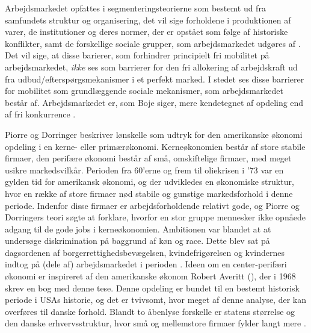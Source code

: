 Arbejdsmarkedet opfattes i segmenteringsteorierne som bestemt ud fra samfundets struktur og organisering, det vil sige forholdene i produktionen af varer, de institutioner og deres normer, der er opstået som følge af historiske konflikter, samt de forskellige sociale grupper, som arbejdsmarkedet udgøres af \parencite[9]{Boje1985}. Det  vil sige, at disse barierer, som forhindrer principielt fri mobilitet på arbejdsmarkedet, \emph{ikke} ses som barrierer for den fri allokering af arbejdskraft ud fra udbud/efterspørgsmekanismer i et perfekt marked. I stedet ses disse barrierer for mobilitet som grundlæggende sociale mekanismer, som arbejdsmarkedet består af. Arbejdsmarkedet er, som Boje siger, mere kendetegnet af opdeling end af fri konkurrence \parencite[8]{Boje1985}. 

Piorre og Dorringer beskriver lønskelle som udtryk for den amerikanske økonomi opdeling i en kerne- eller primærøkonomi. Kerneøkonomien består af store stabile firmaer, den perifære økonomi består af små, omskiftelige firmaer, med meget usikre markedsvilkår. %
Perioden fra 60'erne og frem til oliekrisen i '73 var en gylden tid for amerikansk økonomi, og der udvikledes en økonomiske struktur, hvor en række af store firmaer nød stabile og gunstige markedsforhold i denne periode. %
Indenfor disse firmaer er arbejdsforholdende relativt gode, og Piorre og Dorringers teori søgte at forklare, hvorfor en stor gruppe mennesker ikke opnåede adgang til de gode jobs i kerneøkonomien. Ambitionen var blandet at at undersøge diskrimination på baggrund af køn og race. Dette blev sat på dagsordenen af borgerrettighedsbevægelsen, kvindefrigørelsen og kvindernes indtog på (dele af) arbejdsmarkedet i perioden \parencites[1216]{Cain1976}. Ideen om en center-perifæri økonomi er inspireret af den amerikanske økonom Robert Averitt (\citeyear{Averitt1968}), der i 1968 skrev en bog med denne tese. Denne opdeling er bundet til en bestemt historisk periode i USAs historie, og det er tvivsomt, hvor meget af denne analyse, der kan overføres til danske forhold. Blandt to åbenlyse forskelle er statens størrelse og den danske erhvervsstruktur, hvor små og mellemstore firmaer fylder langt mere \parencite[36,120]{Boje1985}.  %

